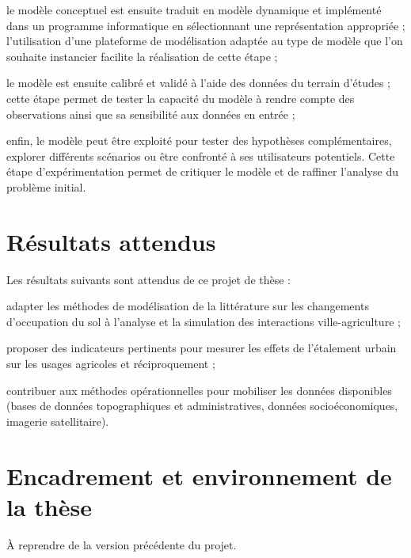 \item le modèle conceptuel est ensuite traduit en modèle dynamique
   et implémenté dans un programme informatique
   en sélectionnant une représentation appropriée ;
   l'utilisation d'une plateforme de modélisation
   adaptée au type de modèle que l'on souhaite instancier
   facilite la réalisation de cette étape ;

\item le modèle est ensuite calibré et validé à l'aide des données
   du terrain d'études ; cette étape permet de tester la capacité
   du modèle à rendre compte des observations ainsi
   que sa sensibilité aux données en entrée ;

\item enfin, le modèle peut être exploité pour
   tester des hypothèses complémentaires, explorer
   différents scénarios ou être confronté à
   ses utilisateurs potentiels. Cette étape d'expérimentation
   permet de critiquer le modèle et de raffiner l'analyse du
   problème initial.

\stopitemize


\section{Résultats attendus}

Les résultats suivants sont attendus de ce projet de thèse :

\startitemize

\item adapter les méthodes de modélisation de la littérature sur les changements d'occupation du sol
  à l'analyse et la simulation des interactions ville-agriculture ;

\item proposer des indicateurs pertinents pour mesurer les effets de l'étalement urbain
  sur les usages agricoles et réciproquement ;

\item contribuer aux méthodes opérationnelles
  pour mobiliser les données disponibles 
  (bases de données topographiques et administratives, données socioéconomiques,
  imagerie satellitaire).

\stopitemize

\section{Encadrement et environnement de la thèse}

À reprendre de la version précédente du projet.